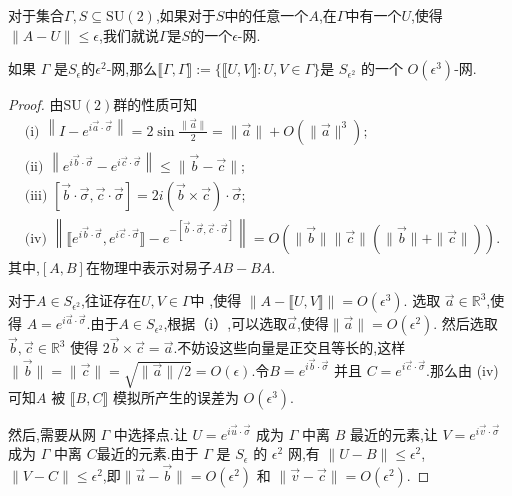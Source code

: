 对于集合$\Gamma, S \subseteq \mathrm{SU}(2)$,如果对于$S$中的任意一个$A$,在$\Gamma$中有一个$U$,使得$\|A-U\| \leq \epsilon$,我们就说$\Gamma$是$S$的一个$\epsilon$-网.
\begin{lemma}
	如果 $\Gamma$ 是$S_\epsilon$的$\epsilon^2$-网,那么$\llbracket \Gamma, \Gamma \rrbracket:=\{\llbracket U, V \rrbracket: U, V \in \Gamma\}$是 $S_{\epsilon^2}$ 的一个 $O\left(\epsilon^3\right)$-网.
\end{lemma}
\begin{proof}
	由$\mathrm{SU}(2)$群的性质可知
	\begin{align*}
		& \text{(i) } \left\|I-e^{i \vec{a} \cdot \vec{\sigma}}\right\|=2 \sin \frac{\|\vec{a}\|}{2}=\|\vec{a}\|+O\left(\|\vec{a}\|^3\right) ;& \\
		& \text{(ii) } \left\|e^{i \vec{b} \cdot \vec{\sigma}}-e^{i \vec{c} \cdot \vec{\sigma}}\right\| \leq\|\vec{b}-\vec{c}\|; & \\
		& \text{(iii) } [\vec{b} \cdot \vec{\sigma}, \vec{c} \cdot \vec{\sigma}]=2 i(\vec{b} \times \vec{c}) \cdot \vec{\sigma} ;& \\
		& \text{(iv) } \left\|\llbracket e^{i \vec{b} \cdot \vec{\sigma}}, e^{i \vec{c} \cdot \vec{\sigma}} \rrbracket-e^{-[\vec{b} \cdot \vec{\sigma}, \vec{c} \cdot \vec{\sigma}]}\right\|=O(\|\vec{b}\|\|\vec{c}\|(\|\vec{b}\|+\|\vec{c}\|)). &
	\end{align*}
	其中,$[A,B]$在物理中表示对易子$AB-BA$.
	
	对于$A \in S_{\epsilon^2}$,往证存在$U, V \in \Gamma$中 ,使得 $\|A-\llbracket U, V \rrbracket\|=O\left(\epsilon^3\right)$.
	选取 $\vec{a} \in \mathbb{R}^3$,使得 $A=e^{i \vec{a} \cdot \vec{\sigma}}$.由于$A \in S_{\epsilon^2}$,根据（i）,可以选取$\vec{a}$,使得$\|\vec{a}\|=O\left(\epsilon^2\right)$.
	然后选取 $\vec{b}, \vec{c} \in \mathbb{R}^3$ 使得 $2 \vec{b} \times \vec{c}=\vec{a}$.不妨设这些向量是正交且等长的,这样$\|\vec{b}\|=\|\vec{c}\|=\sqrt{\|\vec{a}\| / 2}=O(\epsilon)$.令$B=e^{i \vec{b} \cdot \vec{\sigma}}$ 并且 $C=e^{i \vec{c} \cdot \vec{\sigma}}$.那么由 (iv) 可知$A$ 被 $\llbracket B, C \rrbracket$ 模拟所产生的误差为 $O\left(\epsilon^3\right)$.
	
	然后,需要从网 $\Gamma$ 中选择点.让 $U=e^{i \vec{u} \cdot \vec{\sigma}}$ 成为 $\Gamma$ 中离 $B$ 最近的元素,让 $V=e^{i \vec{v} \cdot \vec{\sigma}}$ 成为 $\Gamma$ 中离 $C$最近的元素.由于 $\Gamma$ 是 $S_\epsilon$ 的 $\epsilon^2$ 网,有 $\|U-B\| \leq \epsilon^2$,$\|V-C\| \leq \epsilon^2$,即$\|\vec{u}-\vec{b}\|=O\left(\epsilon^2\right)$ 和 $\|\vec{v}-\vec{c}\|=O\left(\epsilon^2\right)$.
	

\end{proof}
